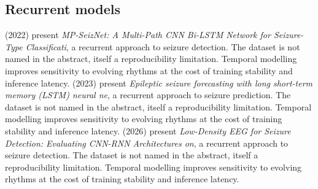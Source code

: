\subsection{Recurrent models}
\citet{ep221104628} (2022) present \emph{MP-SeizNet: A Multi-Path CNN Bi-LSTM Network for Seizure-Type Classificati}, a recurrent approach to seizure detection. The dataset is not named in the abstract, itself a reproducibility limitation. Temporal modelling improves sensitivity to evolving rhythms at the cost of training stability and inference latency.
\citet{ep230909471} (2023) present \emph{Epileptic seizure forecasting with long short-term memory (LSTM) neural ne}, a recurrent approach to seizure prediction. The dataset is not named in the abstract, itself a reproducibility limitation. Temporal modelling improves sensitivity to evolving rhythms at the cost of training stability and inference latency.
\citet{ep260611970} (2026) present \emph{Low-Density EEG for Seizure Detection: Evaluating CNN-RNN Architectures on}, a recurrent approach to seizure detection. The dataset is not named in the abstract, itself a reproducibility limitation. Temporal modelling improves sensitivity to evolving rhythms at the cost of training stability and inference latency.

